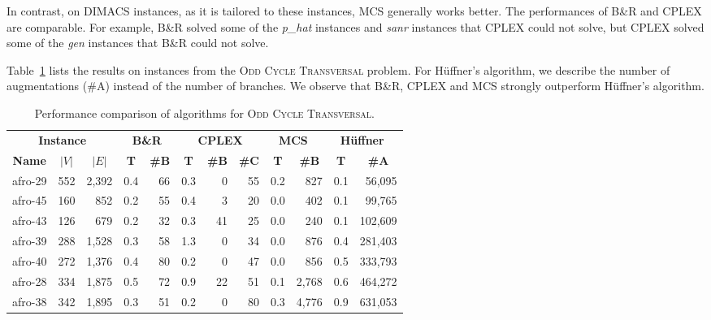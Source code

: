 \documentclass[11pt]{article}
\newcommand{\OCT}{\textsc{Odd Cycle Transversal}\xspace}
\newcommand{\abs}[1]{\left| #1 \right|}
\begin{document}
In contrast, on DIMACS instances, as it is tailored to these instances,
MCS generally works better.
The performances of B\&R and CPLEX are comparable.
For example, B\&R solved some of the \emph{p\_hat} instances and \emph{sanr} instances
that CPLEX could not solve,
but CPLEX solved some of the \emph{gen} instances that B\&R could not solve.


Table~\ref{tbl:comparison_oct} lists the results on instances from the \textsc{Odd Cycle Transversal} problem.
For H{\"u}ffner's algorithm,
we describe the number of augmentations (\#A) instead of the number of branches.
We observe that B\&R, CPLEX and MCS strongly outperform H{\"u}ffner's algorithm.

{
\begin{table}[p!]
\center
\caption{Performance comparison of algorithms for \OCT.}
\label{tbl:comparison_oct}
\fontsize{8pt}{0pt}\selectfont
\begin{tabular*}{\columnwidth}{@{\extracolsep{\fill}}lrr|rr|rrr|rr|rr}
\toprule
\multicolumn{3}{c|}{\textbf{Instance}} & \multicolumn{2}{c|}{\textbf{B\&R}}
 & \multicolumn{3}{c|}{\textbf{CPLEX}} & \multicolumn{2}{c|}{\textbf{MCS~\cite{clique/mcs_walcom10}}}
 & \multicolumn{2}{c}{\textbf{H{\"u}ffner~\cite{oct/huffner09}}} \\
\multicolumn{1}{c}{\textbf{Name}} &
\multicolumn{1}{c}{\textbf{$\abs{V}$}} &
\multicolumn{1}{c|}{\textbf{$\abs{E}$}} &
\multicolumn{1}{c}{\textbf{T}} &
\multicolumn{1}{c|}{\textbf{\#B}} &
\multicolumn{1}{c}{\textbf{T}} &
\multicolumn{1}{c}{\textbf{\#B}} &
\multicolumn{1}{c|}{\textbf{\#C}} &
\multicolumn{1}{c}{\textbf{T}} &
\multicolumn{1}{c|}{\textbf{\#B}} &
\multicolumn{1}{c}{\textbf{T}} &
\multicolumn{1}{c}{\textbf{\#A}} \\
\midrule
afro-29 & 552 & 2,392 & 0.4 & 66 & 0.3 & 0 & 55 & 0.2 & 827 & 0.1 & 56,095 \\
afro-45 & 160 & 852 & 0.2 & 55 & 0.4 & 3 & 20 & 0.0 & 402 & 0.1 & 99,765 \\
afro-43 & 126 & 679 & 0.2 & 32 & 0.3 & 41 & 25 & 0.0 & 240 & 0.1 & 102,609 \\
afro-39 & 288 & 1,528 & 0.3 & 58 & 1.3 & 0 & 34 & 0.0 & 876 & 0.4 & 281,403 \\
afro-40 & 272 & 1,376 & 0.4 & 80 & 0.2 & 0 & 47 & 0.0 & 856 & 0.5 & 333,793 \\
afro-28 & 334 & 1,875 & 0.5 & 72 & 0.9 & 22 & 51 & 0.1 & 2,768 & 0.6 & 464,272 \\
afro-38 & 342 & 1,895 & 0.3 & 51 & 0.2 & 0 & 80 & 0.3 & 4,776 & 0.9 & 631,053 \\

\end{tabular*}
\end{table}}
\end{document}
